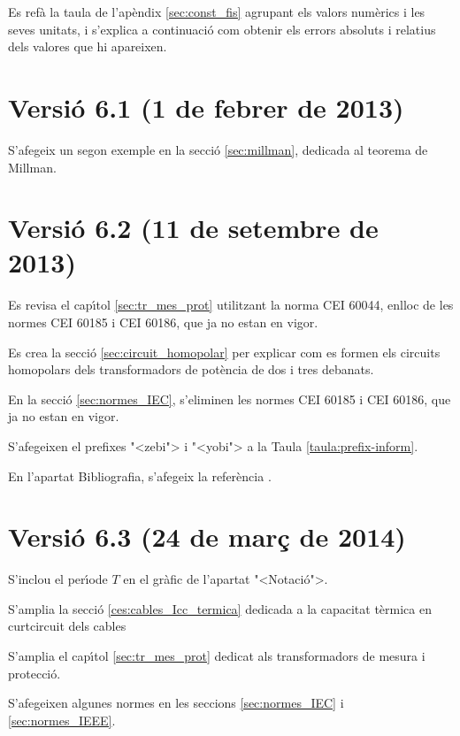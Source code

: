 Es ref\`{a} la taula de l'ap\`{e}ndix \ref{sec:const_fis} agrupant els valors num\`{e}rics i les seves unitats, i s'explica a continuaci\'{o} com obtenir els errors absoluts i relatius dels valores que hi apareixen.

\section*{Versi\'{o} 6.1 (1 de febrer de 2013)}

S'afegeix un segon exemple en la secci\'{o} \ref{sec:millman}, dedicada al teorema de Millman.


\section*{Versi\'{o} 6.2 (11 de setembre de 2013)}

 Es revisa el cap\'{\i}tol \ref{sec:tr_mes_prot} utilitzant la norma \textsf{CEI 60044}, enlloc de les normes \textsf{CEI 60185} i \textsf{CEI 60186}, que ja no estan en vigor.

Es crea la secci\'{o} \ref{sec:circuit_homopolar} per explicar com es formen els circuits homopolars dels transformadors de pot\`{e}ncia de dos i tres debanats.

En la secci\'{o} \ref{sec:normes_IEC}, s'eliminen les normes \textsf{CEI 60185} i \textsf{CEI 60186}, que ja no estan en vigor.

S'afegeixen el prefixes {"<}zebi{">} i {"<}yobi{">} a la Taula \ref{taula:prefix-inform}.

En l'apartat Bibliografia, s'afegeix la refer\`{e}ncia \cite{RASe}.

\section*{Versi\'{o} 6.3 (24 de mar\c{c} de 2014)}

S'inclou el per\'{\i}ode $T$ en el gr\`{a}fic de l'apartat {"<}Notaci\'{o}{">}.

S'amplia la secci\'{o} \ref{ces:cables_Icc_termica} dedicada a la capacitat t\`{e}rmica en curtcircuit dels cables

S'amplia el cap\'{\i}tol \ref{sec:tr_mes_prot} dedicat als transformadors de mesura i protecci\'{o}.

S'afegeixen algunes normes en les seccions \ref{sec:normes_IEC} i \ref{sec:normes_IEEE}.

